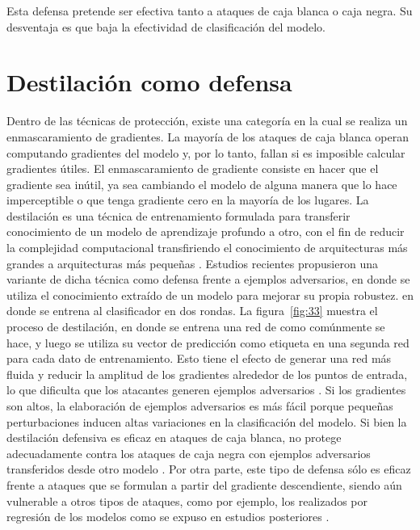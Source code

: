 Esta defensa pretende ser efectiva tanto a ataques de caja blanca o caja negra. Su desventaja es que baja la efectividad de clasificación del modelo.


\section{Destilación como defensa}

Dentro de las técnicas de protección, existe una categoría en la cual se realiza un enmascaramiento de gradientes. La mayoría de los ataques de caja blanca operan computando gradientes del modelo y, por lo tanto, fallan si es imposible calcular gradientes útiles. El enmascaramiento de gradiente consiste en hacer que el gradiente sea inútil, ya sea cambiando el modelo de alguna manera que lo hace imperceptible o que tenga gradiente cero en la mayoría de los lugares.
La destilación es una técnica de entrenamiento formulada para transferir conocimiento de un modelo de aprendizaje profundo a otro, con el fin de reducir la complejidad computacional transfiriendo el conocimiento de arquitecturas más grandes a arquitecturas más pequeñas \parencite{r61}. Estudios recientes propusieron una variante de dicha técnica como defensa frente a ejemplos adversarios, en donde se utiliza el conocimiento extraído de un modelo para mejorar su propia robustez. en donde se entrena al clasificador en dos rondas. La figura~\ref{fig:33} muestra el proceso de destilación, en donde se entrena una red de como comúnmente se hace, y luego se utiliza su vector de predicción como etiqueta en una segunda red para cada dato de entrenamiento. Esto tiene el efecto de generar una red más fluida y reducir la amplitud de los gradientes alrededor de los puntos de entrada, lo que dificulta que los atacantes generen ejemplos adversarios \parencite{r24}. Si los gradientes son altos, la elaboración de ejemplos adversarios es más fácil porque pequeñas perturbaciones inducen altas variaciones en la clasificación del modelo. 
Si bien la destilación defensiva es eficaz en ataques de caja blanca, no protege adecuadamente contra los ataques de caja negra con ejemplos adversarios transferidos desde otro modelo \parencite{r28}. Por otra parte, este tipo de defensa sólo es eficaz frente a ataques que se formulan a partir del gradiente descendiente, siendo aún vulnerable a otros tipos de ataques, como por ejemplo, los realizados por regresión de los modelos como se expuso en estudios posteriores \parencite{r55}. 

